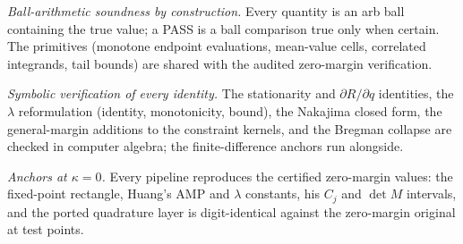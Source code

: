 \documentclass[11pt]{article}
\theoremstyle{remark}
\begin{document}
\emph{Ball-arithmetic soundness by construction.}  Every quantity is
an arb ball containing the true value; a PASS is a ball comparison
true only when certain.  The primitives (monotone endpoint
evaluations, mean-value cells, correlated integrands, tail bounds)
are shared with the audited zero-margin verification.

\emph{Symbolic verification of every identity.}  The stationarity
and $\partial R/\partial q$ identities, the $\lambda$ reformulation
(identity, monotonicity, bound), the Nakajima closed form, the
general-margin additions to the constraint kernels, and the Bregman
collapse are checked in computer algebra; the finite-difference
anchors run alongside.

\emph{Anchors at $\kappa=0$.}  Every pipeline reproduces the
certified zero-margin values: the fixed-point rectangle, Huang's
AMP and $\lambda$ constants, his $C_j$ and $\det M$ intervals, and
the ported quadrature layer is digit-identical against the
zero-margin original at test points.
\end{document}
